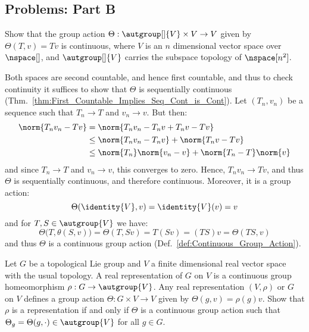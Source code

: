     \subsection{Problems: Part B}
        \begin{problem}
            Show that the group action
            $\Theta:\autgroup[]{V}\times{V}\rightarrow{V}$ given by
            $\Theta(T,v)=Tv$ is continuous, where $V$ is an $n$ dimensional
            vector space over $\nspace[]$, and $\autgroup[]{V}$ carries the
            subspace topology of $\nspace[n^{2}]$.
        \end{problem}
        \begin{solution}
            Both spaces are second countable, and hence first countable, and
            thus to check continuity it suffices to show that $\Theta$ is
            sequentially continuous
            (Thm.~\ref{thm:First_Countable_Implies_Seq_Cont_is_Cont}).
            Let $(T_{n},v_{n})$ be a sequence such that
            $T_{n}\rightarrow{T}$ and $v_{n}\rightarrow{v}$. But then:
            \begin{subequations}
                \begin{align}
                    \norm{T_{n}v_{n}-Tv}&=\norm{T_{n}v_{n}-T_{n}v+T_{n}v-Tv}\\
                    &\leq\norm{T_{n}v_{n}-T_{n}v}+\norm{T_{n}v-Tv}\\
                    &\leq\norm{T_{n}}\norm{v_{n}-v}+\norm{T_{n}-T}\norm{v}
                \end{align}
            \end{subequations}
            and since $T_{n}\rightarrow{T}$ and $v_{n}\rightarrow{v}$, this
            converges to zero. Hence, $T_{n}v_{n}\rightarrow{T}v$, and thus
            $\Theta$ is sequentially continuous, and therefore continuous.
            Moreover, it is a group action:
            \begin{equation}
                \Theta(\identity{V},v)=\identity{V}(v)=v
            \end{equation}
            and for $T,S\in\autgroup{V}$ we have:
            \begin{equation}
                \Theta\big(T,\theta(S,v)\big)=\Theta(T,Sv)
                =T(Sv)=(TS)v=\Theta(TS,v)
            \end{equation}
            and thus $\Theta$ is a continuous group action
            (Def.~\ref{def:Continuous_Group_Action}).
        \end{solution}
        \begin{problem}
            Let $G$ be a topological Lie group and $V$ a finite dimensional real
            vector space with the usual topology. A real representation of $G$
            on $V$ is a continuous group homeomorphism
            $\rho:G\rightarrow\autgroup{V}$. Any real representation $(V,\rho)$
            or $G$ on $V$ defines a group action
            $\Theta:G\times{V}\rightarrow{V}$ given by
            $\Theta(g,v)=\rho(g)v$. Show that $\rho$ is a representation if and
            only if $\Theta$ is a continuous group action such that
            $\Theta_{g}=\Theta(g,\cdot)\in\autgroup{V}$ for all $g\in{G}$.
        \end{problem}
